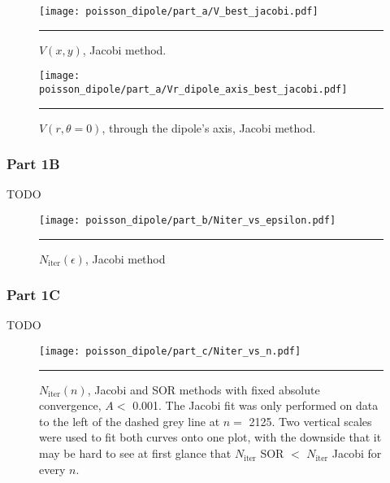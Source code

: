\documentclass[notitlepage,aps,prd,nofootinbib]{revtex4-1}
\begin{document}
\begin{figure}[!htbc]
  \centering
  \texttt{[image: poisson\_dipole/part\_a/V\_best\_jacobi.pdf]}
	{\par\nobreak\rule[9pt]{35em}{0.5pt}\vspace{-5mm}}
	\caption{$V\left(x, y\right)$, Jacobi method.}
	\label{fig:part1a_V}
\end{figure}

\begin{figure}[!htbc]
  \centering
  \texttt{[image: poisson\_dipole/part\_a/Vr\_dipole\_axis\_best\_jacobi.pdf]}
	{\par\nobreak\rule[9pt]{35em}{0.5pt}\vspace{-5mm}}
	\caption{$V\left(r, \theta=0\right)$, through the dipole's axis, Jacobi method.}
	\label{fig:part1a_Vr}
\end{figure}

\clearpage
\subsubsection{Part 1B}
\label{subsubsec:part_1b}

TODO

\begin{figure}[!htbc]
  \centering
  \texttt{[image: poisson\_dipole/part\_b/Niter\_vs\_epsilon.pdf]}
	{\par\nobreak\rule[9pt]{35em}{0.5pt}\vspace{-5mm}}
	\caption{$N_{\mathrm{iter}}\left(\epsilon\right)$, Jacobi method}
	\label{fig:part1b}
\end{figure}

\clearpage
\subsubsection{Part 1C}
\label{subsubsec:part_1c}

TODO

\begin{figure}[!htbc]
  \centering
  \texttt{[image: poisson\_dipole/part\_c/Niter\_vs\_n.pdf]}
	{\par\nobreak\rule[9pt]{35em}{0.5pt}\vspace{-5mm}}
	\caption{$N_{\mathrm{iter}}\left(n\right)$, Jacobi and SOR methods with fixed absolute convergence, $A <$ 0.001. The Jacobi fit was only performed on data to the left of the dashed grey line at $n =$ 2125. Two vertical scales were used to fit both curves onto one plot, with the downside that it may be hard to see at first glance that $N_{\mathrm{iter}}$ SOR $<$ $N_{\mathrm{iter}}$ Jacobi for every $n$.}
	\label{fig:part1c}
\end{figure}
\end{document}
